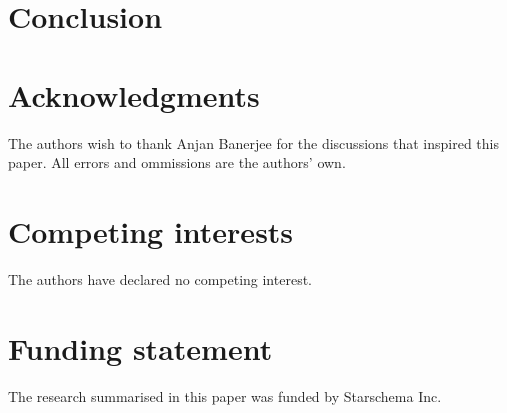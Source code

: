 \documentclass[fleqn,10pt]{SelfArx} %
\begin{document}
\section{Conclusion} %
\label{sec:conclusion}


\section*{Acknowledgments} %


The authors wish to thank Anjan Banerjee for the discussions that inspired this paper. All errors and ommissions are the authors' own.

\section*{Competing interests} %


The authors have declared no competing interest.

\section*{Funding statement} %


The research summarised in this paper was funded by Starschema Inc.






\end{document}
